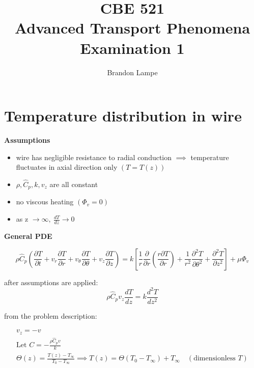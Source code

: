\documentclass[letterpaper, 10pt, oneside]{article}
\title{CBE 521\\ Advanced Transport Phenomena\\ Examination 1}
\author{Brandon Lampe}
\newenvironment{dd}[1]{
	\noindent
	\textbf{\normalsize{#1}}
	\hspace{0.1in}
	\small
	\rmfamily
	}
	{\medskip}
\begin{document}
\maketitle
\section{Temperature distribution in wire}

\begin{dd}{Assumptions}
	\begin{itemize}
		\item wire has negligible resistance to radial conduction $\implies$ temperature fluctuates in axial direction only $\left( T=T(z) \right)$
		\item $\rho, \hat{C}_p, k, v_z $ are all constant
		\item no viscous heating $\left( \Phi_v = 0 \right)$
		\item as z $\rightarrow \infty, \ \frac{dT}{dz} \rightarrow 0$
	\end{itemize}
\end{dd}

\begin{dd}{General PDE}
$$\rho \hat{C}_p \left( \frac{\partial T}{\partial t} + v_r \frac{\partial T}{\partial r} + v_{\theta} \frac{\partial T}{\partial \theta} + v_z \frac{\partial T}{\partial z} \right)  = k \left[\frac{1}{r} \frac{\partial}{\partial r} \left( \frac{r \partial T}{\partial r} \right) + \frac{1}{r^2} \frac{\partial ^2 T}{\partial \theta^2} + \frac{\partial^2 T}{\partial z^2}\right] + \mu \Phi_v$$

after assumptions are applied:
	\begin{equation}
		\rho \hat{C}_p v_z \frac{d T}{d z}  = k \frac{d^2 T}{d z^2}
	\end{equation}

from the problem description:

	\begin{gather}
		v_z = -v \\
		\text{Let } C = -\frac{\rho \hat{C}_p v}{k} \\
		\Theta(z) = \frac{T(z) - T_{\infty}}{T_0 - T_{\infty}} \implies T(z) = \Theta(T_0 - T_{\infty})+T_{\infty} \quad (\text{dimensionless } T)
	\end{gather}
\end{dd}
\end{document}
